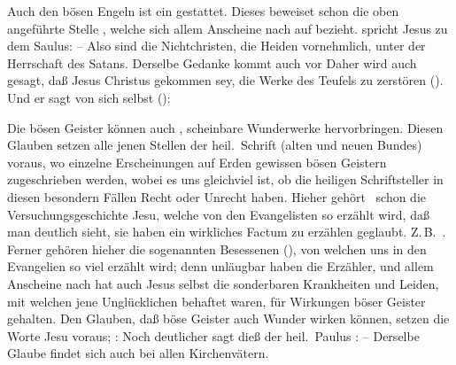 \begin{aufza}
\begin{aufzb}
\item Auch den bösen Engeln ist ein  gestattet. Dieses beweiset schon die oben angeführte Stelle , welche sich allem Anscheine nach auf  bezieht.  spricht Jesus zu dem Saulus:  -- Also sind die Nichtchristen, die Heiden vornehmlich, unter der Herrschaft des Satans. Derselbe Gedanke kommt auch vor  Daher wird auch gesagt, daß Jesus Christus gekommen sey, die Werke des Teufels zu zerstören (). Und er sagt von sich selbst (): 
\item Die bösen Geister können auch , scheinbare Wunderwerke hervorbringen. Diesen Glauben setzen alle jenen Stellen der heil.\ Schrift (alten und neuen Bundes) voraus, wo einzelne Erscheinungen auf Erden gewissen bösen Geistern zugeschrieben werden, wobei es uns gleichviel ist, ob die heiligen Schriftsteller in diesen besondern Fällen Recht oder Unrecht haben. Hieher gehört \zB\ schon die Versuchungsgeschichte Jesu, welche von den Evangelisten so erzählt wird, daß man deutlich sieht, sie haben ein wirkliches Factum zu erzählen geglaubt. Z.\,B.\ . Ferner gehören hieher die sogenannten Besessenen (), von welchen uns in den Evangelien so viel erzählt wird; denn unläugbar haben die Erzähler, und allem Anscheine nach hat auch Jesus selbst die sonderbaren Krankheiten und Leiden, mit welchen jene Unglücklichen behaftet waren, für Wirkungen böser Geister gehalten. Den Glauben, daß böse Geister auch Wunder wirken können, setzen die Worte Jesu voraus; :  Noch deutlicher sagt dieß der heil.\ Paulus :  -- Derselbe Glaube findet sich auch bei allen Kirchenvätern.\par

\end{aufzb}
\end{aufza}
